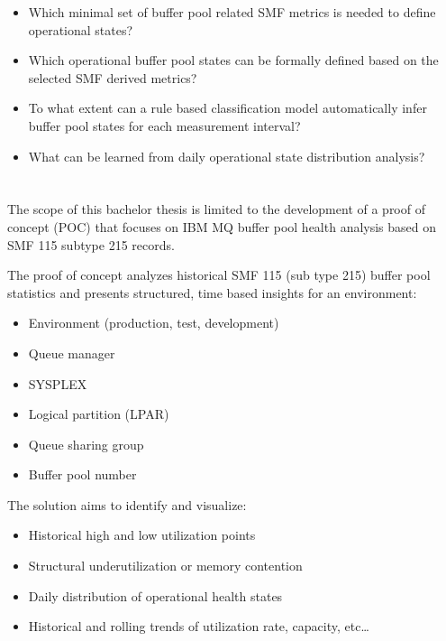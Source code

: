 \begin{itemize}
    \item Which minimal set of buffer pool related SMF metrics is needed to define operational states?
    
    \item Which operational buffer pool states can be formally defined based on the selected SMF derived metrics?
    
    \item To what extent can a rule based classification model automatically infer buffer pool states for each measurement interval?
    
    \item What can be learned from daily operational state distribution analysis?
\end{itemize}


\section{}%
\label{sec:afbakening}%

The scope of this bachelor thesis is limited to the development of a proof of concept (POC) that focuses on IBM MQ buffer pool health analysis based on SMF 115 subtype 215 records.

The proof of concept analyzes historical SMF 115 (sub type 215) buffer pool statistics and presents structured, time based insights for an environment:

\begin{itemize}
    \item Environment (production, test, development)
    \item Queue manager
    \item SYSPLEX
    \item Logical partition (LPAR)
    \item Queue sharing group
    \item Buffer pool number
\end{itemize}


The solution aims to identify and visualize:

\begin{itemize}
    \item Historical high and low utilization points  
    \item Structural underutilization or memory contention  
    \item Daily distribution of operational health states  
    \item Historical and rolling trends of utilization rate, capacity, etc\ldots
\end{itemize}

